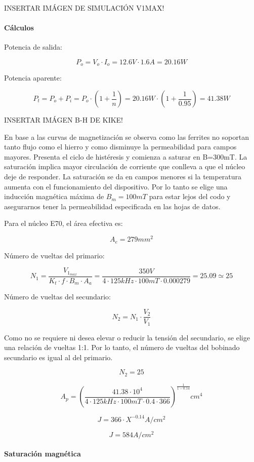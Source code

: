 INSERTAR IMÁGEN DE SIMULACIÓN V1MAX!

\paragraph{Cálculos}

Potencia de salida:

$$ P_{o}=V_{o}\cdot I_{o}=12.6V\cdot 1.6A=20.16W $$

Potencia aparente: 

$$P_t=P_o+P_i=P_o\cdot\left(1+\frac{1}{n}\right)=20.16W\cdot\left(1+\frac{1}{0.95}\right)=41.38W  $$

INSERTAR IMÁGEN B-H DE KIKE!

En base a las curvas de magnetización se observa como las ferrites no soportan tanto flujo como el hierro y como disminuye la permeabilidad para campos mayores.  
Presenta el ciclo de histéresis y comienza a saturar en B=300mT. 
La saturación implica mayor circulación de corriente que conlleva a que el núcleo deje de responder. 
La saturación se da en campos menores si la temperatura aumenta con el funcionamiento del dispositivo. 
Por lo tanto se elige una inducción magnética máxima de $B_{m}=100mT$ para estar lejos del codo y asegurarnos tener la permeabilidad especificada en las hojas de datos. 

Para el núcleo E70, el área efectiva es: 

$$ A_{e}=279{mm}^{2} $$

Número de vueltas del primario:

$$ N_{1}=\frac{V_{1_{max}}}{K_{t}\cdot f\cdot B_{m}\cdot A_{a}}=\frac{350V}{4\cdot 125kHz\cdot 100mT\cdot 0.000279}=25.09\simeq 25 $$

Número de vueltas del secundario: 

$$ N_{2}=N_{1}\cdot\frac{V_{2}}{V_{1}} $$

Como no se requiere ni desea elevar o reducir la tensión del secundario, se elige una relación de vueltas 1:1. 
Por lo tanto, el número de vueltas del bobinado secundario es igual al del primario. 

$$ N_{2}=25 $$

$$ A_{p}=\left(\frac{41.38\cdot 10^{4}}{4\cdot 125kHz\cdot 100mT\cdot 0.4\cdot 366}\right)^{\frac{1}{1-0.14}} {cm}^4 $$

$$ J=366\cdot X^{-0.14} A/{cm}^2 $$

$$ J=584 A/{cm}^2 $$

\paragraph{Saturación magnética}

